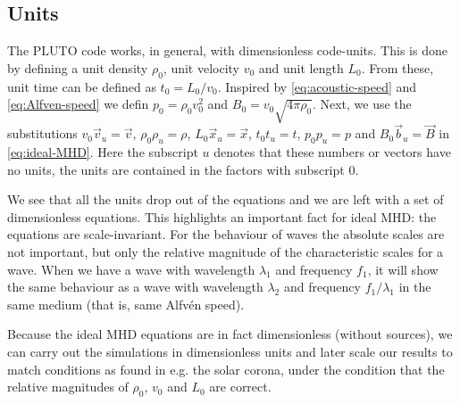 \subsection{Units}
The PLUTO code works, in general, with dimensionless code-units. This is done by defining a unit density $\rho_0$, unit velocity $v_0$ and unit length $L_0$.
From these, unit time can be defined as $t_0=L_0/v_0$. Inspired by \autoref{eq:acoustic-speed} and \autoref{eq:Alfven-speed} we defin $p_0=\rho_0v_0^2$ and $B_0=v_0\sqrt{4\pi\rho_0}$.
Next, we use the substitutions $v_0\vec{v}_u=\vec{v}$, $\rho_0\rho_u=\rho$, $L_0\vec{x}_u=\vec{x}$, $t_0t_u=t$, $p_0p_u=p$ and $B_0\vec{b}_u=\vec{B}$ in \autoref{eq:ideal-MHD}.
Here the subscript $u$ denotes that these numbers or vectors have no units, the units are contained in the factors with subscript $0$.

{\centering 
\noindent {}
\par}

We see that all the units drop out of the equations and we are left with a set of dimensionless equations.
This highlights an important fact for ideal MHD: the equations are scale-invariant.
For the behaviour of waves the absolute scales are not important, but only the relative magnitude of the characteristic scales for a wave.
When we have a wave with wavelength $\lambda_1$ and frequency $f_1$, it will show the same behaviour as a wave with wavelength $\lambda_2$ and frequency $f_1/\lambda_1$ in the same medium (that is, same Alfvén speed).

Because the ideal MHD equations are in fact dimensionless (without sources), we can carry out the simulations in dimensionless units and later scale our results to match conditions as found in e.g. the solar corona, under the condition that the relative magnitudes of $\rho_0$, $v_0$ and $L_0$ are correct.


